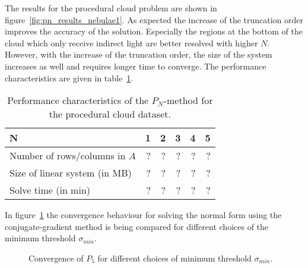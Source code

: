 The results for the procedural cloud problem are shown in figure~\ref{fig:pn_results_nebulae1}. As expected the increase of the truncation order improves the accuracy of the solution. Especially the regions at the bottom of the cloud which only receive indirect light are better resolved with higher $N$. However, with the increase of the truncation order, the size of the system increases as well and requires longer time to converge. The performance characteristics are given in table~\ref{tab:results_cloud}.
\begin{table}[!h]
	\centering
	\caption[TODO]{Performance characteristics of the $P_N$-method for the procedural cloud dataset.}
	\label{tab:results_cloud}
	\begin{tabular}{l r r r r r}
    \hline
	\textbf{N}
    & 1 & 2 & 3 & 4 & 5
    \\
    \hline
    Number of rows/columns in $A$
    & ? & ? & ? & ? & ?
    \\
    Size of linear system (in MB)
    & ? & ? & ? & ? & ?
    \\
    Solve time (in min)
    & ? & ? & ? & ? & ?
	\end{tabular}
\end{table}

In figure~\ref{fig:pn_results_convergence} the convergence behaviour for solving the normal form using the conjugate-gradient method is being compared for different choices of the minimum threshold $\sigma_{min}$.
\begin{figure}[h]
\centering
{}
\caption{Convergence of $P_5$ for different choices of minimum threshold $\sigma_{min}$.}
\label{fig:pn_results_convergence}
\end{figure}




